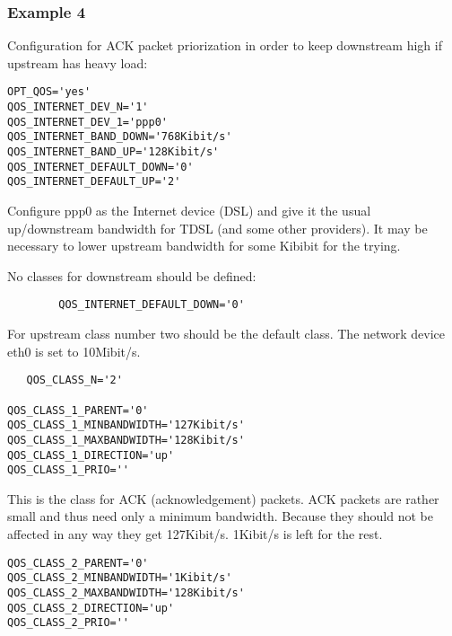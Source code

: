 \subsubsection{Example 4}


   Configuration for ACK packet priorization in order to keep
   downstream high if upstream has heavy load:

\begin{small}
\begin{example}
\begin{verbatim}
OPT_QOS='yes'
QOS_INTERNET_DEV_N='1'
QOS_INTERNET_DEV_1='ppp0'
QOS_INTERNET_BAND_DOWN='768Kibit/s'
QOS_INTERNET_BAND_UP='128Kibit/s'
QOS_INTERNET_DEFAULT_DOWN='0'
QOS_INTERNET_DEFAULT_UP='2'

\end{verbatim}
\end{example}
\end{small}

   Configure ppp0 as the Internet device (DSL) and give it the usual
   up/downstream bandwidth for TDSL (and some other providers). It may be
   necessary to lower upstream bandwidth for some Kibibit for the trying.

   No classes for downstream should be defined:
\begin{example}
\begin{verbatim}
        QOS_INTERNET_DEFAULT_DOWN='0'
\end{verbatim}
\end{example}

   For upstream class number two should be the default class. The network device
   eth0 is set to 10Mibit/s.

\begin{small}
\begin{example}
\begin{verbatim}
   QOS_CLASS_N='2'

QOS_CLASS_1_PARENT='0'
QOS_CLASS_1_MINBANDWIDTH='127Kibit/s'
QOS_CLASS_1_MAXBANDWIDTH='128Kibit/s'
QOS_CLASS_1_DIRECTION='up'
QOS_CLASS_1_PRIO=''

\end{verbatim}
\end{example}
\end{small}
   This is the class for ACK (acknowledgement) packets. ACK packets are rather
   small and thus need only a minimum bandwidth. Because they should not be
   affected in any way they get 127Kibit/s. 1Kibit/s is left for the rest.

\begin{small}
\begin{example}
\begin{verbatim}
QOS_CLASS_2_PARENT='0'
QOS_CLASS_2_MINBANDWIDTH='1Kibit/s'
QOS_CLASS_2_MAXBANDWIDTH='128Kibit/s'
QOS_CLASS_2_DIRECTION='up'
QOS_CLASS_2_PRIO=''
\end{verbatim}
\end{example}
\end{small}


